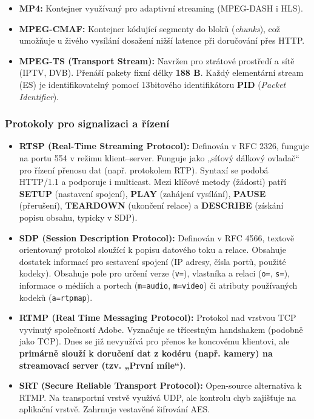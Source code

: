         \begin{itemize}
            \item \textbf{MP4:} Kontejner využívaný pro adaptivní streaming (MPEG-DASH i HLS).
            \item \textbf{MPEG-CMAF:} Kontejner kódující segmenty do bloků (\textit{chunks}), což umožňuje u živého vysílání dosažení nižší latence při doručování přes HTTP.
            \item \textbf{MPEG-TS (Transport Stream):} Navržen pro ztrátové prostředí a sítě (IPTV, DVB). Přenáší pakety fixní délky \textbf{188 B}. Každý elementární stream (ES) je identifikovatelný pomocí 13bitového identifikátoru \textbf{PID} (\textit{Packet Identifier}).
        \end{itemize}
    \subsubsection{Protokoly pro signalizaci a řízení}
        \begin{itemize}
            \item \textbf{RTSP (Real-Time Streaming Protocol):} Definován v RFC 2326, funguje na portu 554 v režimu klient--server. Funguje jako „síťový dálkový ovladač“ pro řízení přenosu dat (např. protokolem RTP). Syntaxí se podobá HTTP/1.1 a podporuje i multicast. Mezi klíčové metody (žádosti) patří \textbf{SETUP} (nastavení spojení), \textbf{PLAY} (zahájení vysílání), \textbf{PAUSE} (přerušení), \textbf{TEARDOWN} (ukončení relace) a \textbf{DESCRIBE} (získání popisu obsahu, typicky v SDP).
            \item \textbf{SDP (Session Description Protocol):} Definován v RFC 4566, textově orientovaný protokol sloužící k popisu datového toku a relace. Obsahuje dostatek informací pro sestavení spojení (IP adresy, čísla portů, použité kodeky). Obsahuje pole pro určení verze (\texttt{v=}), vlastníka a relaci (\texttt{o=}, \texttt{s=}), informace o médiích a portech (\texttt{m=audio}, \texttt{m=video}) či atributy používaných kodeků (\texttt{a=rtpmap}).
            \item \textbf{RTMP (Real Time Messaging Protocol):} Protokol nad vrstvou TCP vyvinutý společností Adobe. Vyznačuje se třícestným handshakem (podobně jako TCP). Dnes se již nevyužívá pro přenos ke koncovému klientovi, ale \textbf{primárně slouží k doručení dat z kodéru (např. kamery) na streamovací server (tzv. „První míle“)}.
            \item \textbf{SRT (Secure Reliable Transport Protocol):} Open-source alternativa k RTMP. Na transportní vrstvě využívá UDP, ale kontrolu chyb zajišťuje na aplikační vrstvě. Zahrnuje vestavěné šifrování AES.
        \end{itemize}
